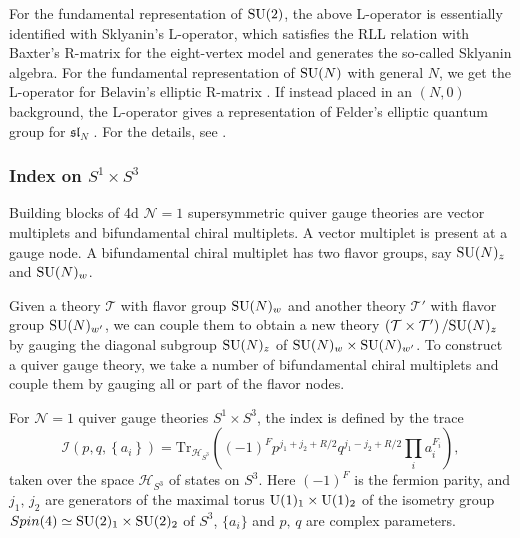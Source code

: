 For the fundamental representation of $\mathrm{SU}(2)$, the above L-operator
is essentially identified with Sklyanin's L-operator, which satisfies
the RLL relation with Baxter's R-matrix for the eight-vertex model
and generates the so-called Sklyanin algebra. For the fundamental
representation of $\mathrm{SU}(N)$ with general $N$, we get the L-operator
for Belavin's elliptic R-matrix \cite{Belavin:1981ix}. If instead placed in
an $\left( N,0 \right)$ background, the L-operator gives a representation
of Felder's elliptic quantum group for $\mathfrak{sl}_{N}$ \cite{Felder:1994pb,Felder:1994be,MR1606760}.
For the
details, see \cite{Yagi:2017hmj}.



\subsubsection*{Index on $S^{1}\times S^{3}$}

Building blocks of 4d $\mathcal{N}=1$ supersymmetric quiver gauge
theories are vector multiplets and bifundamental chiral multiplets.
A vector multiplet is present at a gauge node. A bifundamental chiral
multiplet has two flavor groups, say $\mathrm{SU}(N)_{z}$ and $\mathrm{SU}(N)_{w}$.

Given a theory $\mathcal{T}$ with flavor group $\mathrm{SU}(N)_{w}$ and another
theory $\mathcal{T}'$ with flavor group $\mathrm{SU}(N)_{w'}$, we can couple
them to obtain a new theory $\left(\mathcal{T}\times\mathcal{T}'\right)/\mathrm{SU}(N)_{z}$
by gauging the diagonal subgroup $\mathrm{SU}(N)_{z}$ of $\mathrm{SU}(N)_{w}\times \mathrm{SU}(N)_{w'}$.
To construct a quiver gauge theory, we take a number of bifundamental
chiral multiplets and couple them by gauging all or part of the flavor
nodes.

For $\mathcal{N}=1$ quiver gauge theories $S^{1}\times S^{3}$, the
index is defined by the trace
\begin{equation}
    \mathcal{I}(p,q,\left\{ a_{i}\right\} )
      =  \mathrm{Tr}_{\mathcal{H}_{S^{3}}}
      \left(    \left( -1 \right)^{F}  p^{j_{1}+j_{2}+R/2}  q^{j_{1}-j_{2}+R/2}  \prod_{i}a_{i}^{F_{i}}    \right),
\end{equation}
taken over the space $\mathcal{H}_{S^{3}}$ of states on $S^{3}$.
Here $\left(-1\right)^{F}$ is the fermion parity, and $j_{1},\,j_{2}$
are generators of the maximal torus $\mathrm{U}(1)_{1}\times \mathrm{U}(1)_{2}$ of
the isometry group $Spin(4)\simeq \mathrm{SU}(2)_{1}\times \mathrm{SU}(2)_{2}$ of $S^{3}$,
$\{ a_i \}$ and $p,\,q$ are complex parameters.

